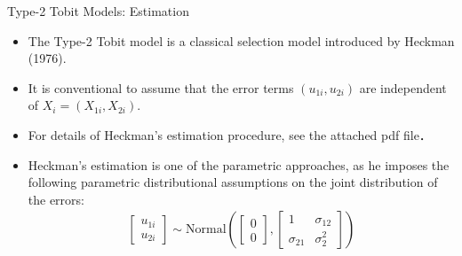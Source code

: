 \documentclass[xcolor=svgnames,dvipdfmx,cjk]{beamer}
\theoremstyle{example}
\begin{document}
\begin{frame}{Type-2 Tobit Models: Estimation}
      \begin{itemize}
            \item The Type-2 Tobit model is a classical selection model introduced by Heckman (1976).
            \item It is conventional to assume that the error terms $(u_{1i}, u_{2i})$ are independent of $X_i = (X_{1i}, X_{2i})$.
            \item For details of Heckman's estimation procedure, see the attached pdf file．
            \item Heckman's estimation is one of the parametric approaches, 
                  as he imposes the following parametric distributional assumptions on the joint distribution of the errors:
                  \begin{align*}
                        \begin{bmatrix}
                              u_{1i} \\ u_{2i}
                        \end{bmatrix}
                        \sim 
                        \text{Normal}
                        \left(
                              \begin{bmatrix}
                                    0 \\ 0
                              \end{bmatrix},
                              \begin{bmatrix}
                                    1 & \sigma_{12} \\
                                    \sigma_{21} & \sigma_{2}^2
                              \end{bmatrix}
                        \right)
                  \end{align*}
      \end{itemize}
\end{frame}
\end{document}

